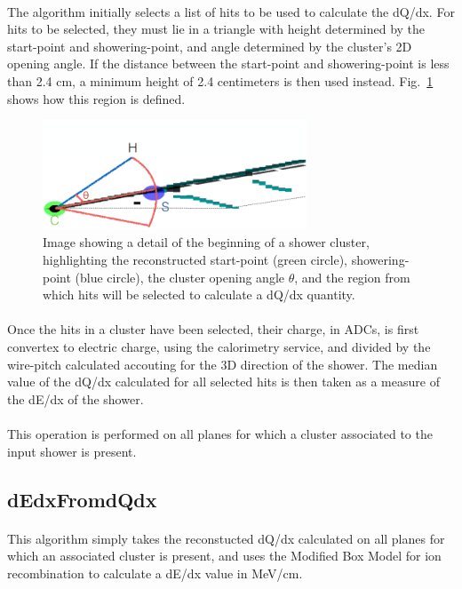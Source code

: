 \paragraph{}The algorithm initially selects a list of hits to be used to calculate the dQ/dx. For hits to be selected, they must lie in a triangle with height determined by the start-point and showering-point, and angle determined by the cluster's 2D opening angle. If the distance between the start-point and showering-point is less than 2.4 cm, a minimum height of 2.4 centimeters is then used instead. Fig.~\ref{fig:dQdx_hitselection} shows how this region is defined.
\begin{figure}[H]
\centering
\includegraphics[width=0.7\textwidth]{figures/dQdx_hitselection.png}
\caption{Image showing a detail of the beginning of a shower cluster, highlighting the reconstructed start-point (green circle), showering-point (blue circle), the cluster opening angle $\theta$, and the region from which hits will be selected to calculate a dQ/dx quantity.}
\label{fig:dQdx_hitselection}
\end{figure}
\paragraph{}Once the hits in a cluster have been selected, their charge, in ADCs, is first convertex to electric charge, using the calorimetry service, and divided by the wire-pitch calculated accouting for the 3D direction of the shower. The median value of the dQ/dx calculated for all selected hits is then taken as a measure of the dE/dx of the shower.
\paragraph{}This operation is performed on all planes for which a cluster associated to the input shower is present.

\subsection{dEdxFromdQdx}
\paragraph{}This algorithm simply takes the reconstucted dQ/dx calculated on all planes for which an associated cluster is present, and uses the Modified Box Model for ion recombination to calculate a dE/dx value in MeV/cm.


